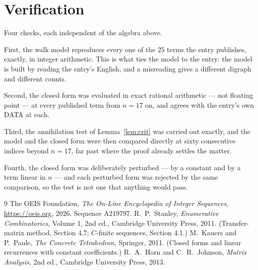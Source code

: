 \documentclass[11pt,a4paper]{article}
\theoremstyle{plain}
\theoremstyle{definition}
\begin{document}
\section{Verification}

Four checks, each independent of the algebra above.

First, the walk model reproduces every one of the $25$ terms the entry publishes,
exactly, in integer arithmetic. This is what ties the model to the entry: the model is built
by reading the entry's English, and a misreading gives a different digraph and different
counts.

Second, the closed form was evaluated in exact rational arithmetic --- not floating point ---
at every published term from $n=17$ on, and agrees with the entry's own DATA at each.

Third, the annihilation test of Lemma~\ref{lem:crit} was carried out exactly, and the model
and the closed form were then compared directly at sixty consecutive indices beyond
$n=17$, far past where the proof already settles the matter.

Fourth, the closed form was deliberately perturbed --- by a constant and by a term linear in
$n$ --- and each perturbed form was rejected by the same comparison, so the test is not one
that anything would pass.

\begin{thebibliography}{9}
 The OEIS Foundation, \emph{The On-Line Encyclopedia of Integer
Sequences}, \url{https://oeis.org}, 2026. Sequence A219797.
 R.~P.~Stanley, \emph{Enumerative Combinatorics}, Volume 1, 2nd ed.,
Cambridge University Press, 2011. (Transfer-matrix method, Section 4.7; $C$-finite sequences,
Section 4.1.)
 M.~Kauers and P.~Paule, \emph{The Concrete Tetrahedron}, Springer, 2011.
(Closed forms and linear recurrences with constant coefficients.)
 R.~A.~Horn and C.~R.~Johnson, \emph{Matrix Analysis}, 2nd ed., Cambridge
University Press, 2013.
\end{thebibliography}
\end{document}
